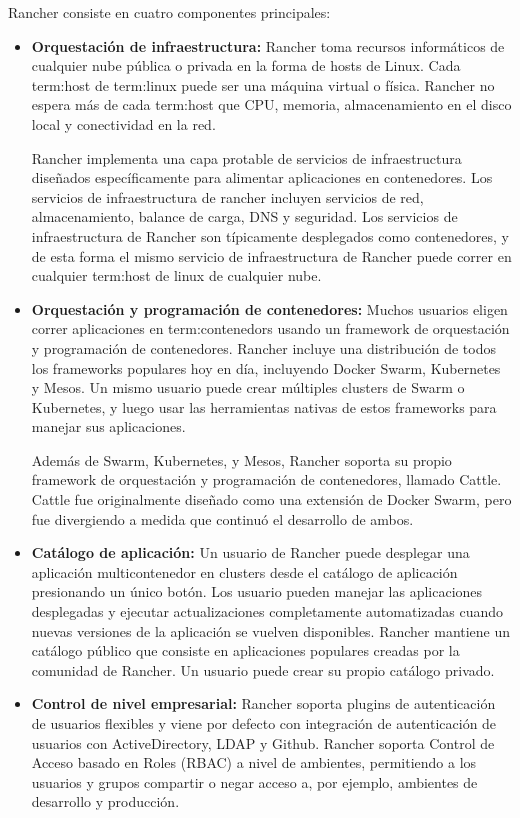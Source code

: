 Rancher consiste en cuatro componentes principales:

\begin{itemize}

  \item \textbf{Orquestación de infraestructura:}
    Rancher toma recursos informáticos de cualquier nube pública o privada en
    la forma de hosts de Linux. Cada \gls{term:host} de \gls{term:linux} puede
    ser una máquina virtual o física. Rancher no espera más de cada
    \gls{term:host} que CPU, memoria, almacenamiento en el disco local y
    conectividad en la red.

    Rancher implementa una capa protable de servicios de infraestructura
    diseñados específicamente para alimentar aplicaciones en contenedores. Los
    servicios de infraestructura de rancher incluyen servicios de red,
    almacenamiento, balance de carga, DNS y seguridad. Los servicios de
    infraestructura de Rancher son típicamente desplegados como contenedores, y
    de esta forma el mismo servicio de infraestructura de Rancher puede correr
    en cualquier \gls{term:host} de linux de cualquier nube.

  \item \textbf{Orquestación y programación de contenedores:}
    Muchos usuarios eligen correr aplicaciones en \glspl{term:contenedor}
    usando un framework de orquestación y programación de contenedores. Rancher
    incluye una distribución de todos los frameworks populares hoy en día,
    incluyendo Docker Swarm, Kubernetes y Mesos. Un mismo usuario puede crear
    múltiples clusters de Swarm o Kubernetes, y luego usar las herramientas
    nativas de estos frameworks para manejar sus aplicaciones.

    Además de Swarm, Kubernetes, y Mesos, Rancher soporta su propio framework
    de orquestación y programación de contenedores, llamado Cattle. Cattle fue
    originalmente diseñado como una extensión de Docker Swarm, pero fue
    divergiendo a medida que continuó el desarrollo de ambos.

  \item \textbf{Catálogo de aplicación:}
    Un usuario de Rancher puede desplegar una aplicación multicontenedor en
    clusters desde el catálogo de aplicación presionando un único botón. Los
    usuario pueden manejar las aplicaciones desplegadas y ejecutar
    actualizaciones completamente automatizadas cuando nuevas versiones de la
    aplicación se vuelven disponibles. Rancher mantiene un catálogo público que
    consiste en aplicaciones populares creadas por la comunidad de Rancher. Un
    usuario puede crear su propio catálogo privado.

  \item \textbf{Control de nivel empresarial:}
    Rancher soporta plugins de autenticación de usuarios flexibles y viene por
    defecto con integración de autenticación de usuarios con ActiveDirectory,
    LDAP y Github. Rancher soporta Control de Acceso basado en Roles (RBAC) a
    nivel de ambientes, permitiendo a los usuarios y grupos compartir o negar
    acceso a, por ejemplo, ambientes de desarrollo y producción.

\end{itemize}

\clearpage

